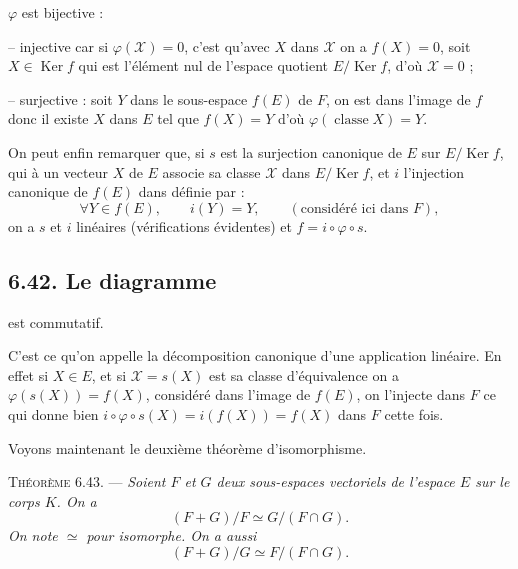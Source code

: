 $\varphi$ est bijective :

-- injective car si $\varphi(\mathcal X)=0$, c'est qu'avec $X$ dans $\mathcal X$ on a $f(X)=0$, soit $X\in\operatorname{Ker}f$ qui est l'élément nul de l'espace quotient $E/\operatorname{Ker}f$, d'où $\mathcal X=0$ ;

-- surjective : soit $Y$ dans le sous-espace $f(E)$ de $F$, on est dans l'image de $f$ donc il existe $X$ dans $E$ tel que $f(X)=Y$ d'où $\varphi(\operatorname{classe}X)=Y$. \bookend

On peut enfin remarquer que, si $s$ est la surjection canonique de $E$ sur $E/\operatorname{Ker}f$, qui à un vecteur $X$ de $E$ associe sa classe $\mathcal X$ dans $E/\operatorname{Ker}f$, et $i$ l'injection canonique de $f(E)$ dans  définie par :
\[
\forall Y\in f(E),\qquad i(Y)=Y,\qquad(\text{considéré ici dans }F),
\]
on a $s$ et $i$ linéaires (vérifications évidentes) et $f=i\circ\varphi\circ s$.

\subsection*{6.42. Le diagramme}
\begin{center}
\end{center}
est commutatif.

C'est ce qu'on appelle la décomposition canonique d'une application linéaire. En effet si $X\in E$, et si $\mathcal X=s(X)$ est sa classe d'équivalence on a $\varphi(s(X))=f(X)$, considéré dans l'image de $f(E)$, on l'injecte dans $F$ ce qui donne bien $i\circ\varphi\circ s(X)=i(f(X))=f(X)$ dans $F$ cette fois. \bookend

Voyons maintenant le deuxième théorème d'isomorphisme.

\medskip\noindent\textsc{Théorème 6.43.} --- \emph{Soient $F$ et $G$ deux sous-espaces vectoriels de l'espace $E$ sur le corps $K$. On a
\[
(F+G)/F\simeq G/(F\cap G).
\]
On note $\simeq$ pour isomorphe. On a aussi
\[
(F+G)/G\simeq F/(F\cap G).
\]}

